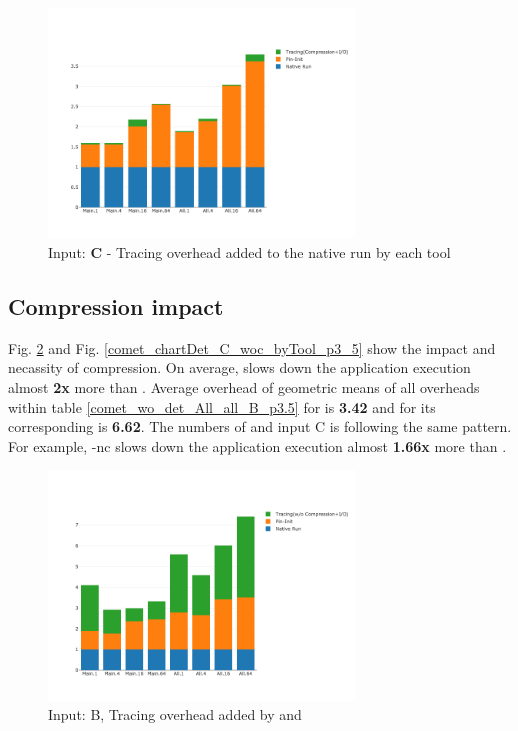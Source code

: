 \begin{figure}[!t]
\centering
\includegraphics[width=3.2in]{figs.comet.newMed/comet_chartDet_C_wc_byTool_p3_5.png}
\caption{ Input: \textbf{C} - Tracing overhead added to the native run by each tool
}
\label{comet_chartDet_C_wc_byTool_p3_5}
\end{figure}






\subsection{Compression impact} 
\label{subsec:compact}

Fig. \ref{comet_chartDet_B_woc_byTool_p3_5} and Fig. \ref{comet_chartDet_C_woc_byTool_p3_5} show the impact and necassity of compression. On average, \parlotnc slows down the application execution almost \textbf{2x} more than \parlota. Average overhead of geometric means of all overheads within table \ref{comet_wo_det_All_all_B_p3.5} for \parlota is \textbf{3.42} and for its corresponding \parlotnc is \textbf{6.62}. The numbers of \parlotm and input C is following the same pattern. For example, \parlot-nc slows down the application execution almost \textbf{1.66x} more than \parlotm.


\begin{figure}[!t]
\centering
\includegraphics[width=3.2in]{figs.comet.newMed/comet_chartDet_B_woc_byTool_p3_5.png}
\caption{ Input: B, Tracing overhead added by \pininit and \parlotnc
}
\label{comet_chartDet_B_woc_byTool_p3_5}
\end{figure}

